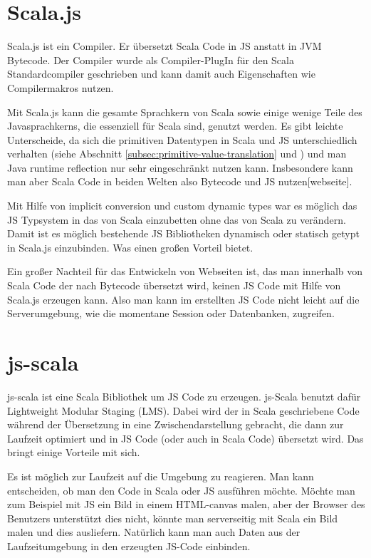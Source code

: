 \documentclass[12pt,bibtotoc]{scrreprt}
\begin{document}
\section{Scala.js}
\label{sec:scala-js}

Scala.js ist ein Compiler. Er übersetzt Scala Code in JS anstatt in JVM Bytecode\cite{Doeraene2013}. Der Compiler wurde als Compiler-PlugIn für den Scala Standardcompiler geschrieben und kann damit auch Eigenschaften wie Compilermakros nutzen. 

Mit Scala.js kann die gesamte Sprachkern von Scala sowie einige wenige Teile des Javasprachkerns, die essenziell für Scala sind, genutzt werden. Es gibt leichte Unterscheide, da sich die primitiven Datentypen in Scala und JS unterschiedlich verhalten (siehe Abschnitt \ref{subsec:primitive-value-translation} und \cite{Doeraene2014}) und man Java runtime reflection nur sehr eingeschränkt nutzen kann. Insbesondere kann man aber Scala Code in beiden Welten also Bytecode und JS nutzen[webseite].

Mit Hilfe von implicit conversion und custom dynamic types war es möglich das JS Typsystem in das von Scala einzubetten ohne das von Scala zu verändern. Damit ist es möglich bestehende JS Bibliotheken dynamisch oder statisch getypt in Scala.js einzubinden. Was einen großen Vorteil bietet. 

Ein großer Nachteil für das Entwickeln von Webseiten ist, das man innerhalb von Scala Code der nach Bytecode übersetzt wird, keinen JS Code mit Hilfe von Scala.js erzeugen kann. Also man kann im erstellten JS Code nicht leicht auf die Serverumgebung, wie die momentane Session oder Datenbanken, zugreifen.

\section{js-scala}

js-scala ist eine Scala Bibliothek um JS Code zu erzeugen\cite{Kossakowski2012}. js-Scala benutzt dafür Lightweight Modular Staging (LMS)\cite{Rompf2010}. Dabei wird der in Scala geschriebene Code während der Übersetzung in eine Zwischendarstellung gebracht, die dann zur Laufzeit optimiert und in JS Code (oder auch in Scala Code) übersetzt wird. Das bringt einige Vorteile mit sich. 

Es ist möglich zur Laufzeit auf die Umgebung zu reagieren. Man kann entscheiden, ob man den Code in Scala oder JS ausführen möchte. Möchte man zum Beispiel mit JS ein Bild in einem HTML-canvas malen, aber der Browser des Benutzers unterstützt dies nicht, könnte man serverseitig mit Scala ein Bild malen und dies ausliefern. Natürlich kann man auch Daten aus der Laufzeitumgebung in den erzeugten JS-Code einbinden.
\end{document}
